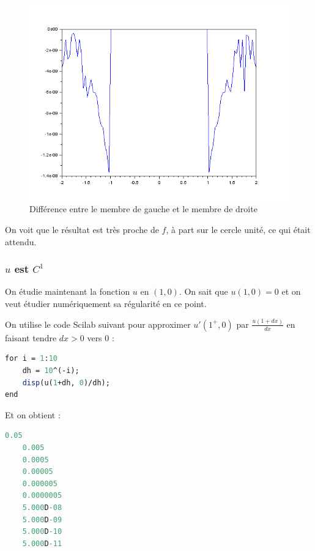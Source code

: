 \documentclass[12pt,a4paper,twoside]{article}
\begin{document}
\begin{figure}[!h]
\begin{center}
\includegraphics[scale=0.5]{Images/erreur.png}
\caption{Différence entre le membre de gauche et le membre de droite}
\label{difff}
\end{center}
\end{figure}


On voit que le résultat est très proche de $f$, à part sur le cercle unité, ce qui était attendu.

\subsubsection{$u$ est $C^1$}

On étudie maintenant la fonction $u$ en $(1,0)$. On sait que $u(1,0)=0$ et on veut étudier numériquement sa régularité en ce point.

On utilise le code Scilab suivant pour approximer $u'(1^{+},0)$ par $\frac{u(1 + dx)}{dx}$ en faisant tendre $dx > 0$ vers $0$ :

\begin{lstlisting}[frame=single, language=Scilab]
for i = 1:10
    dh = 10^(-i);
    disp(u(1+dh, 0)/dh);
end
\end{lstlisting}

Et on obtient : 

\begin{lstlisting}[frame=single, language=Scilab]
    0.05  
    0.005  
    0.0005  
    0.00005  
    0.000005  
    0.0000005  
    5.000D-08  
    5.000D-09  
    5.000D-10  
    5.000D-11  
\end{lstlisting}
\end{document}
